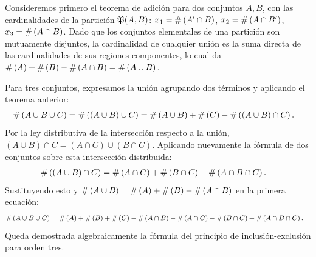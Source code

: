 \begin{solproblema}[prob:6d1bd44]
	Consideremos primero el teorema de adición para dos conjuntos $A, B$, con las cardinalidades de la partición $\mathfrak{P}(A,B)$: $x_1 = \#\left( A' \cap B \right)$, $x_2 = \#\left( A \cap B' \right)$, $x_3 = \#\left( A \cap B \right)$. Dado que los conjuntos elementales de una partición son mutuamente disjuntos, la cardinalidad de cualquier unión es la suma directa de las cardinalidades de sus regiones componentes, lo cual da $\#\left( A \right) + \#\left( B \right) - \#\left( A \cap B \right) = \#\left( A \cup B \right)$.

	Para tres conjuntos, expresamos la unión agrupando dos términos y aplicando el teorema anterior:
	\begin{align}
		\#\left( A \cup B \cup C \right) &= \#\left( (A \cup B) \cup C \right) = \#\left( A \cup B \right) + \#\left( C \right) - \#\left( (A \cup B) \cap C \right).
	\end{align}
	Por la ley distributiva de la intersección respecto a la unión, $(A \cup B) \cap C = (A \cap C) \cup (B \cap C)$. Aplicando nuevamente la fórmula de dos conjuntos sobre esta intersección distribuida:
	\begin{align}
		\#\left( (A \cup B) \cap C \right) &= \#\left( A \cap C \right) + \#\left( B \cap C \right) - \#\left( A \cap B \cap C \right).
	\end{align}
	Sustituyendo esto y $\#\left( A \cup B \right) = \#\left( A \right) + \#\left( B \right) - \#\left( A \cap B \right)$ en la primera ecuación:
	\begin{align}
		\#\left( A \cup B \cup C \right) &= \#\left( A \right) + \#\left( B \right) + \#\left( C \right) - \#\left( A \cap B \right) - \#\left( A \cap C \right) - \#\left( B \cap C \right) + \#\left( A \cap B \cap C \right).
	\end{align}
	Queda demostrada algebraicamente la fórmula del principio de inclusión-exclusión para orden tres.
\end{solproblema}

